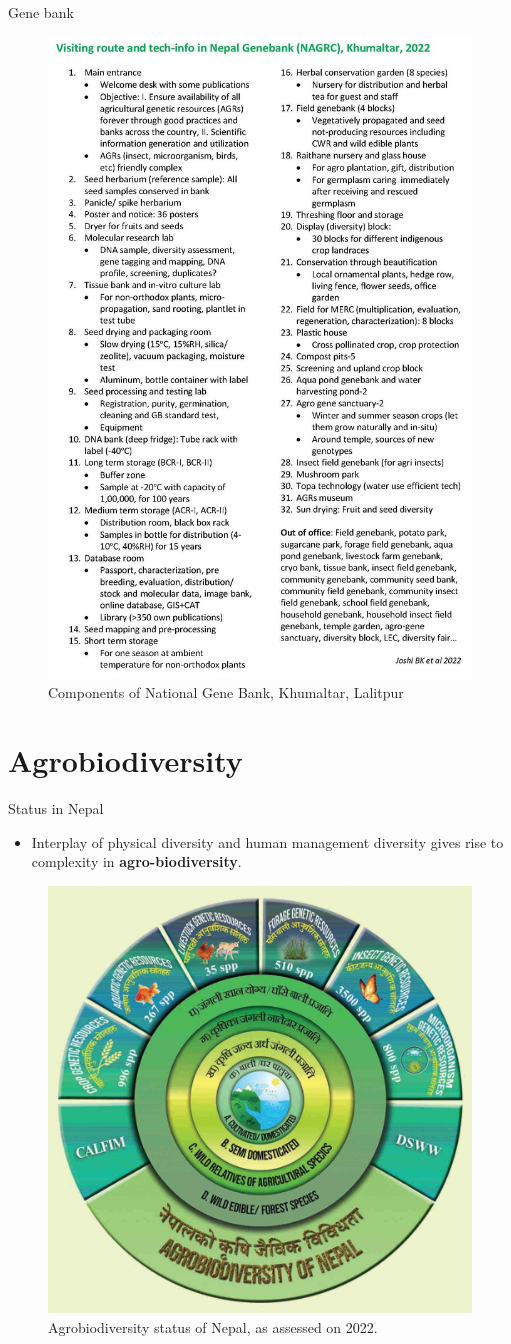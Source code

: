 \documentclass[
  ignorenonframetext,
  aspectratio=169]{beamer}
\providecommand{\tightlist}{%
  \setlength{\itemsep}{0pt}\setlength{\parskip}{0pt}}
\begin{document}
\begin{frame}{Gene bank}
\protect\hypertarget{gene-bank}{}
\begin{figure}
\includegraphics[width=0.35\linewidth]{./../images/genebank_nepal_components} \caption{Components of National Gene Bank, Khumaltar, Lalitpur}\label{fig:national-gene-bank}
\end{figure}
\end{frame}

\hypertarget{agrobiodiversity}{%
\section{Agrobiodiversity}\label{agrobiodiversity}}

\begin{frame}{Status in Nepal}
\protect\hypertarget{status-in-nepal}{}
\footnotesize

\begin{itemize}
\tightlist
\item
  Interplay of physical diversity and human management diversity gives
  rise to complexity in \textbf{agro-biodiversity}.
\end{itemize}

\begin{figure}
\includegraphics[width=0.38\linewidth]{./../images/agro_biodiversity_status_nepal} \caption{Agrobiodiversity status of Nepal, as assessed on 2022.}\label{fig:agrobiodiversity-status}
\end{figure}
\end{frame}
\end{document}
